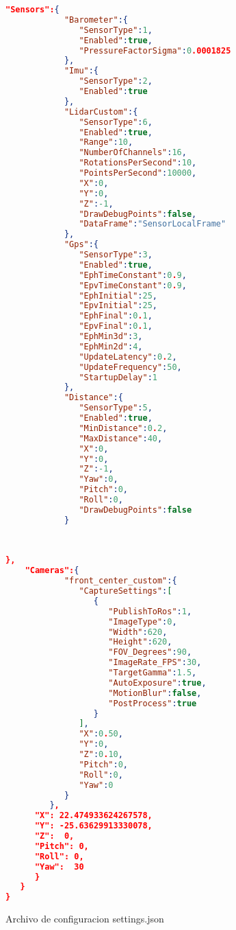 \begin{code}[H]
  \begin{lstlisting}[language=json]
    "Sensors":{
            "Barometer":{
               "SensorType":1,
               "Enabled":true,
               "PressureFactorSigma":0.0001825
            },
            "Imu":{
               "SensorType":2,
               "Enabled":true
            },
            "LidarCustom":{
               "SensorType":6,
               "Enabled":true,
               "Range":10,
               "NumberOfChannels":16,
               "RotationsPerSecond":10,
               "PointsPerSecond":10000,
               "X":0,
               "Y":0,
               "Z":-1,
               "DrawDebugPoints":false,
               "DataFrame":"SensorLocalFrame"
            },
            "Gps":{
               "SensorType":3,
               "Enabled":true,
               "EphTimeConstant":0.9,
               "EpvTimeConstant":0.9,
               "EphInitial":25,
               "EpvInitial":25,
               "EphFinal":0.1,
               "EpvFinal":0.1,
               "EphMin3d":3,
               "EphMin2d":4,
               "UpdateLatency":0.2,
               "UpdateFrequency":50,
               "StartupDelay":1
            },
            "Distance":{
               "SensorType":5,
               "Enabled":true,
               "MinDistance":0.2,
               "MaxDistance":40,
               "X":0,
               "Y":0,
               "Z":-1,
               "Yaw":0,
               "Pitch":0,
               "Roll":0,
               "DrawDebugPoints":false
            }
        
        
  \end{lstlisting}
\end{code}

\begin{code}[H]
  \begin{lstlisting}[language=json]
    },
    "Cameras":{
            "front_center_custom":{
               "CaptureSettings":[
                  {
                     "PublishToRos":1,
                     "ImageType":0,
                     "Width":620,
                     "Height":620,
                     "FOV_Degrees":90,
                     "ImageRate_FPS":30,
                     "TargetGamma":1.5,
                     "AutoExposure":true,
                     "MotionBlur":false,
                     "PostProcess":true
                  }
               ],
               "X":0.50,
               "Y":0,
               "Z":0.10,
               "Pitch":0,
               "Roll":0,
               "Yaw":0
            }
         },
      "X": 22.474933624267578,
      "Y": -25.63629913330078,
      "Z":  0,
      "Pitch": 0,
      "Roll": 0,
      "Yaw":  30
      }
   }
}
  \end{lstlisting}
  \caption[Settings]{Archivo de configuracion settings.json}
  \label{cod:codejemplo}
\end{code}

